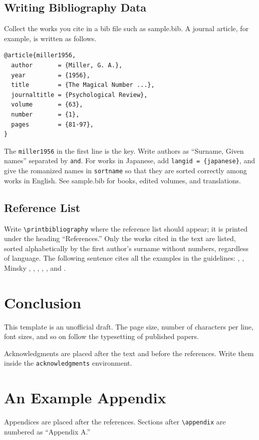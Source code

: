 \documentclass[paper,english]{bunkajoho}
\begin{document}
\subsection{Writing Bibliography Data}

Collect the works you cite in a bib file such as sample.bib.
A journal article, for example, is written as follows.

\begin{small}
\begin{verbatim}
@article{miller1956,
  author       = {Miller, G. A.},
  year         = {1956},
  title        = {The Magical Number ...},
  journaltitle = {Psychological Review},
  volume       = {63},
  number       = {1},
  pages        = {81-97},
}
\end{verbatim}
\end{small}

The \verb|miller1956| in the first line is the key.
Write authors as ``Surname, Given names'' separated by \verb|and|.
For works in Japanese, add \verb|langid = {japanese}|, and give the romanized names in \verb|sortname| so that they are sorted correctly among works in English.
See sample.bib for books, edited volumes, and translations.

\subsection{Reference List}

Write \verb|\printbibliography| where the reference list should appear; it is printed under the heading ``References.''
Only the works cited in the text are listed, sorted alphabetically by the first author's surname without numbers, regardless of language.
The following sentence cites all the examples in the guidelines:
\citet{miller1956}, \citet{cohen1985}, Minsky \citep*{minsky1986,minsky1986b}, \citet{saeki1990}, \citet{minsky1975}, \citet{perrault1990b}, \citet{rosenschein1987}, and \citet{devins1981}.

\section{Conclusion}

This template is an unofficial draft.
The page size, number of characters per line, font sizes, and so on follow the typesetting of published papers.

\begin{acknowledgments}
Acknowledgments are placed after the text and before the references.
Write them inside the \verb|acknowledgments| environment.
\end{acknowledgments}

\printbibliography

\appendix

\section{An Example Appendix}

Appendices are placed after the references.
Sections after \verb|\appendix| are numbered as ``Appendix A.''
\end{document}
